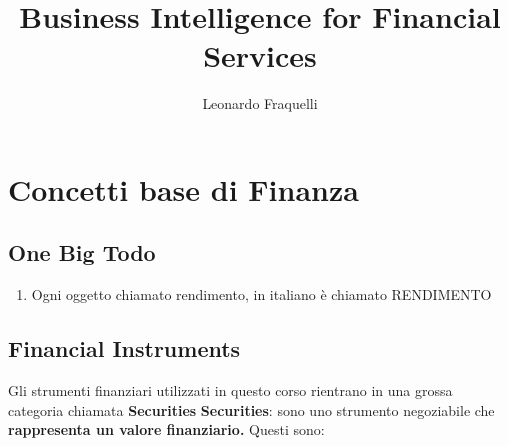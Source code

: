\documentclass[a4paper,11pt]{report}
\title{ Business Intelligence for Financial Services}
\author {Leonardo Fraquelli }
\begin{document}
\maketitle
{%



\part{Concetti base di Finanza}
\chapter{One Big Todo}
\begin{enumerate}
	\item Ogni oggetto chiamato rendimento, in italiano è chiamato RENDIMENTO
\end{enumerate}
\chapter{Financial Instruments}
Gli strumenti finanziari utilizzati in questo corso rientrano in una grossa categoria chiamata {\bfseries Securities} \newline
{\bfseries Securities}: sono uno strumento negoziabile che {\bfseries rappresenta un valore finanziario.} \newline
Questi sono: 
\begin{description}    %


\end{description}}
\end{document}
